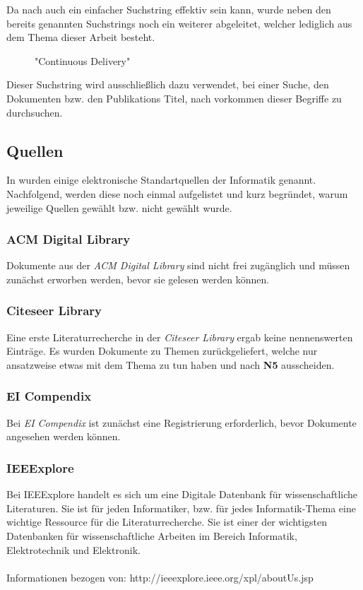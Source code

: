 Da nach \cite[vgl. S. 26]{Kitchenham2007} auch ein einfacher Suchstring effektiv sein kann, wurde neben den bereits genannten Suchstrings noch ein weiterer abgeleitet, welcher lediglich aus dem Thema dieser Arbeit besteht.

\begin{description}
	\item[] "Continuous Delivery"
\end{description}\noindent
Dieser Suchstring wird ausschließlich dazu verwendet, bei einer Suche, den Dokumenten bzw. den Publikations Titel, nach vorkommen dieser Begriffe zu durchsuchen.


\subsection{Quellen}
\label{subsec:quellen}
In \cite{Kitchenham2007} wurden einige elektronische Standartquellen der Informatik genannt. Nachfolgend, werden diese noch einmal aufgelistet und kurz begründet, warum jeweilige Quellen gewählt bzw. nicht gewählt wurde.

\subsubsection{ACM Digital Library}
Dokumente aus der \textit{ACM Digital Library} sind nicht frei zugänglich und müssen zunächst erworben werden, bevor sie gelesen werden können.

\subsubsection{Citeseer Library}
Eine erste Literaturrecherche in der \textit{Citeseer Library} ergab keine nennenswerten Einträge. Es wurden Dokumente zu Themen zurückgeliefert, welche nur ansatzweise etwas mit dem Thema zu tun haben und nach \textbf{N5} ausscheiden.

\subsubsection{EI Compendix}
Bei \textit{EI Compendix} ist zunächst eine Registrierung erforderlich, bevor Dokumente angesehen werden können.

\subsubsection{IEEExplore}
Bei IEEExplore handelt es sich um eine Digitale Datenbank für wissenschaftliche Literaturen. Sie ist für jeden Informatiker, bzw. für jedes Informatik-Thema eine wichtige Ressource für die Literaturrecherche. Sie ist einer der wichtigsten Datenbanken für wissenschaftliche Arbeiten im Bereich Informatik, Elektrotechnik und Elektronik.
\\\\
Informationen bezogen von: http://ieeexplore.ieee.org/xpl/aboutUs.jsp

